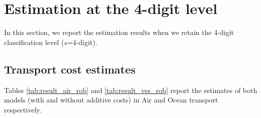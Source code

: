 \documentclass[a4paper,11pt]{article}
\begin{document}
\clearpage
\setcounter{table}{0}
\setcounter{figure}{0}
\renewcommand{\thefigure}{C.\arabic{figure}}
\renewcommand{\thetable}{C.\arabic{table}}

\section{Estimation at the 4-digit level \label{app:4digit}}

In this section, we report the estimation results when we retain the 4-digit classification level ($s$=4-digit).

\subsection{Transport cost estimates}


Tables \ref{tab:result_air_rob} and \ref{tab:result_ves_rob} report the estimates of both models (with and without additive costs) in Air and Ocean transport respectively.
\end{document}
